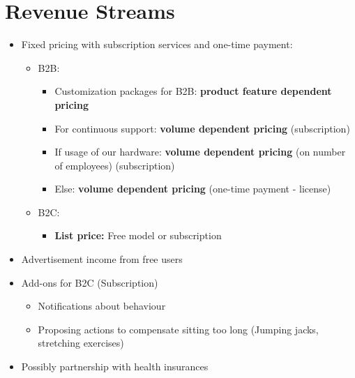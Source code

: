 \section{Revenue Streams}
\begin{itemize}
    \item Fixed pricing with subscription services and one-time payment:
        \begin{itemize}
            \item B2B:
                \begin{itemize}
                    \item Customization packages for B2B: \textbf{product feature dependent pricing}
                    \item For continuous support:  \textbf{volume dependent pricing} (subscription)
                    \item If usage of our hardware: \textbf{volume dependent pricing} (on number of employees) (subscription)
                    \item Else: \textbf{volume dependent pricing} (one-time payment - license)
                \end{itemize}
            \item B2C:
                \begin{itemize}
                    \item \textbf{List price:} Free model or subscription
                \end{itemize}
        \end{itemize}
    \item Advertisement income from free users
    \item Add-ons for B2C (Subscription)
    \begin{itemize}
        \item Notifications about behaviour
        \item Proposing actions to compensate sitting too long (Jumping jacks, stretching exercises)
    \end{itemize}
    \item Possibly partnership with health insurances
\end{itemize}